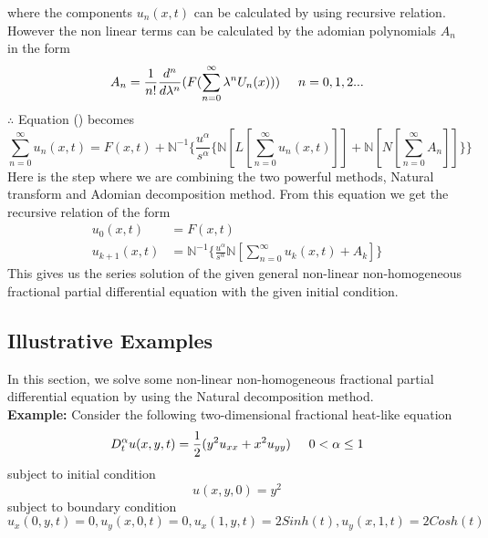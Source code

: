 where the components $ u_{n}(x,t) $ can be calculated by using recursive relation. However the non linear terms can be calculated by the adomian polynomials $ A_{n} $ in the form
\begin{equation}
A_{n} = \frac{1}{n!}\frac{d^n}{d\lambda^n}(F(\sum_{n=0}^{\infty} \lambda^nU_{n}(x)))   \hspace{0.5cm}   n = 0,1,2...
\end{equation}
$\therefore$ Equation () becomes
\begin{equation}
\sum_{n=0}^{\infty}u_{n}(x,t)=F(x,t)+\mathbb{N}^{-1}\lbrace\frac{u^{\alpha}}{s^{\alpha}}\lbrace\mathbb{N}[L[\sum_{n=0}^{\infty}u_{n}(x,t)]] + \mathbb{N}[N[\sum_{n=0}^{\infty}A_{n}]]\rbrace\rbrace
\end{equation}
Here is the step where we are combining the two powerful methods, Natural transform and Adomian decomposition method. From this equation we get the recursive relation of the form
\begin{align}
u_{0}(x,t)&=F(x,t)\\
u_{k+1}(x,t)&=\mathbb{N}^{-1}\lbrace\frac{u^{\alpha}}{s^{\alpha}}\mathbb{N}[\sum_{n=0}^{\infty}u_{k}(x,t)+A_{k}] \rbrace
\end{align}
This gives us the series solution of the given general non-linear non-homogeneous fractional partial differential equation with the given initial condition.
\subsection{Illustrative Examples}
In this section, we solve some non-linear non-homogeneous fractional partial differential equation by using the Natural decomposition method.\\
\textbf{Example:} Consider the following two-dimensional fractional heat-like equation
\begin{equation}
D_{t}^{\alpha}u(x,y,t)=\frac{1}{2}(y^{2}u_{xx}+x^{2}u_{yy}) \hspace{0.5cm} 0 < \alpha \leq 1
\end{equation}
subject to initial condition
\begin{equation}
u(x,y,0)=y^{2}
\end{equation}
subject to boundary condition
\begin{equation}
u_{x}(0,y,t)=0,u_{y}(x,0,t)=0,u_{x}(1,y,t)=2Sinh(t),u_{y}(x,1,t)=2Cosh(t)
\end{equation}


